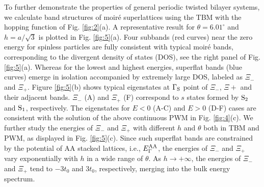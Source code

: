 \documentclass[%
reprint,
amsmath,amssymb,amsfonts
aps,
superscriptaddress,
prx
]{revtex4-1}
\begin{document}
To further demonstrate the properties of general periodic twisted bilayer systems, we calculate band structures of moir\'e superlattices using the TBM with the hopping function of Fig. \ref{fig:2}(a). A representative result for $\theta=6.01^{\circ}$ and $h=a/\sqrt{3}$ is plotted in Fig. \ref{fig:5}(a). Four subbands (red curves) near the zero energy for spinless particles are fully consistent with typical moir\'e bands, corresponding to the divergent density of states (DOS), see the right panel of Fig. \ref{fig:5}(a). Whereas for the lowest and highest energies, superflat bands (blue curves) emerge in isolation accompanied by extremely large DOS, labeled as $\Xi_{-}$ and $\Xi_{+}$. Figure \ref{fig:5}(b) shows typical eigenstates at $\Gamma_{\rm S}$ point of $\Xi_{-}$, $\Xi{+}$ and their adjacent bands. $\Xi_{-}$ (A) and $\Xi_{+}$ (F) correspond to $s$ states formed by ${\rm S}_2$ and ${\rm S}_1$, respectively. The eigenstates for $E<0$ (A-C) and $E>0$ (D-F) cases are consistent with the solution of the above continuous PWM in Fig. \ref{fig:4}(c). We further study the energies of $\Xi_{-}$ and $\Xi_{+}$ with different $h$ and $\theta$ both in TBM and PWM, as displayed in Fig. \ref{fig:5}(c). Since such superflat bands are constrained by the potential of AA stacked lattices, i.e., $E^{\rm AA}_{\Gamma}$, the energies of $\Xi_{-}$ and $\Xi_{+}$ vary exponentially with $h$ in a wide range of $\theta$. As $h\to+\infty$, the energies of $\Xi_{-}$ and $\Xi_{+}$ tend to $-3t_0$ and $3t_0$, respectively, merging into the bulk energy spectrum. 
\end{document}
